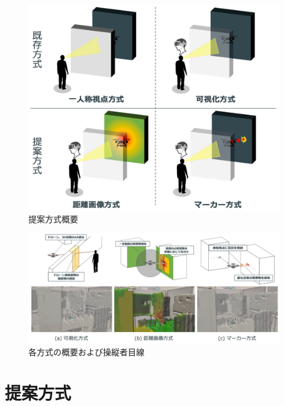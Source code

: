 \documentclass[submit,techrep]{ipsj}
\begin{document}
\begin{figure}[tb]
\centering
\includegraphics[width=\linewidth]{img/03_outline.eps}
\caption{提案方式概要}
\label{fig:03_outline}
\end{figure}

\begin{figure}[!tb]
  \centering
  \includegraphics[width=\linewidth]{img/03_preview.eps}
  \caption{各方式の概要および操縦者目線}
  \label{fig:03_preview}
\end{figure}



\section{提案方式}
\end{document}
